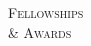 \documentclass[10pt,times]{report}
\newlength{\sectiongap}
\newlength{\entrygap}
\newlength{\sectioncolwidth}
\newlength{\colgap}
\newlength{\stuffwidth}
\def\ifEqString#1#2{\def\testa{#1}\def\testb{#2}%
  \ifx\testa\testb}
\newenvironment{rtable}{
  \begin{minipage}{\textwidth}
  }{
  \end{minipage}
}
\newenvironment{rentry}[3][xxx]{
  \begin{minipage}[t]{\hsize}
    \textbf{#2}\ifEqString{#1}{xxx}\relax\else, \textit{#1}\fi
    \hspace{\stretch{1}} #3 \\
  }{
    \removelastskip
  \end{minipage}
  \\[\entrygap]  %
}
\newenvironment{rsection}[1]{
  \begin{minipage}[t]{\sectioncolwidth}
    \textsc{#1}
  \end{minipage}
  \hspace{\colgap}
  \begin{minipage}[t]{\stuffwidth}
  }{
    \removelastskip
  \end{minipage}
  \\[\sectiongap]
}
\begin{document}
\begin{rtable}
\begin{rsection}{Fellowships\\\& Awards}
  \end{rsection}
\end{rtable}
\end{document}
